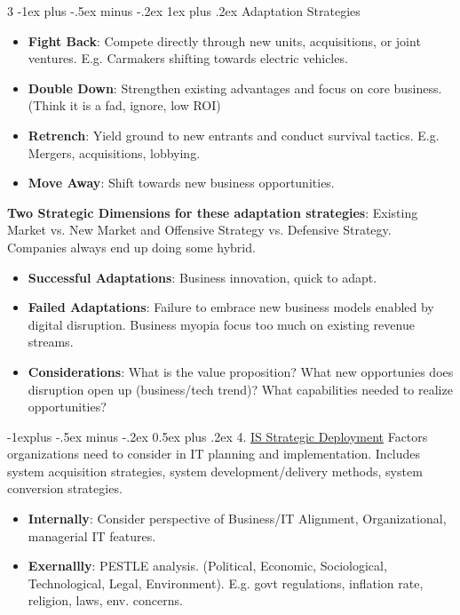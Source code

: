 \documentclass[10pt, landscape]{article}
\makeatletter
\renewcommand{\subsection}{\@startsection{subsection}{2}{0mm}%
                                {-1explus -.5ex minus -.2ex}%
                                {0.5ex plus .2ex}%
                                {\normalfont\normalsize\bfseries}}
\renewcommand{\subsubsection}{\@startsection{subsubsection}{3}{0mm}%
                                {-1ex plus -.5ex minus -.2ex}%
                                {1ex plus .2ex}%
                                {\normalfont\small\bfseries}}
\makeatother
\begin{document}
\begin{multicols*}{3}
\subsubsection{Adaptation Strategies}
\begin{itemize}
    \item \textbf{Fight Back}: Compete directly through new units, acquisitions, or joint ventures. E.g. Carmakers shifting towards electric vehicles.
    \item \textbf{Double Down}: Strengthen existing advantages and focus on core business. (Think it is a fad, ignore, low ROI)
    \item \textbf{Retrench}: Yield ground to new entrants and conduct survival tactics. E.g. Mergers, acquisitions, lobbying.
    \item \textbf{Move Away}: Shift towards new business opportunities.
\end{itemize}
\textbf{Two Strategic Dimensions for these adaptation strategies}: Existing Market vs. New Market and Offensive Strategy vs. Defensive Strategy. Companies always end up doing some hybrid.
\begin{itemize}
\item \textbf{Successful Adaptations}: Business innovation, quick to adapt.
\item \textbf{Failed Adaptations}:  Failure to embrace new business models enabled by digital disruption. Business myopia focus too much on existing revenue streams.
\item \textbf{Considerations}: What is the value proposition? What new opportunies does disruption open up (business/tech trend)? What capabilities needed to realize opportunities?
\end{itemize}

\subsection{4. \underline{IS Strategic Deployment}}
Factors organizations need to consider in IT planning and implementation. Includes system acquisition strategies, system development/delivery methods, system conversion strategies. 
\begin{itemize}
\item \textbf{Internally}: Consider perspective of Business/IT Alignment, Organizational, managerial IT features.
\item \textbf{Exernallly}: PESTLE analysis. (Political, Economic, Sociological, Technological, Legal, Environment). E.g. govt regulations, inflation rate, religion, laws, env. concerns.
\end{itemize}



\end{multicols*}
\end{document}
